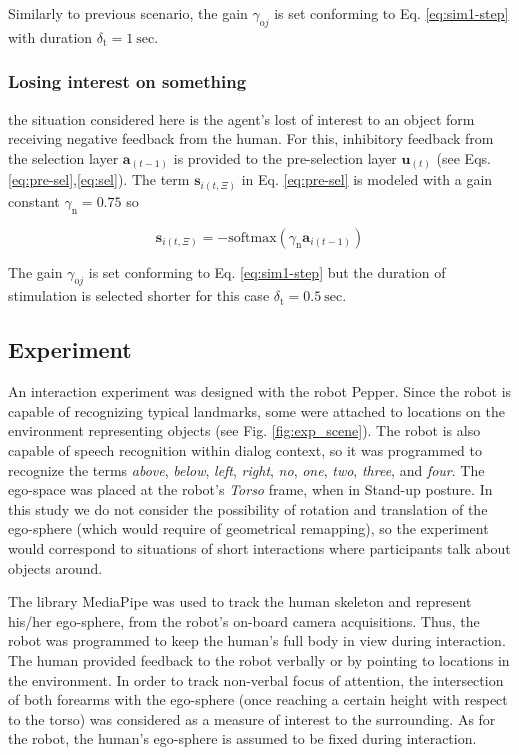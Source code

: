 \documentclass[letterpaper, 10 pt, conference]{ieeeconf}  %
\begin{document}
	\noindent Similarly to previous scenario, the gain $\gamma_{\mathrm{o}j}$ is set conforming to Eq. \eqref{eq:sim1-step} with duration $\delta_\mathrm{t} = 1\ \mathrm{sec}$. 
	
	\subsubsection{Losing interest on something} the situation considered here is the agent's lost of interest to an object form receiving negative feedback from the human. For this, inhibitory feedback from the selection layer $\mathbf{a}_{(t-1)}$ is provided to the pre-selection layer $\mathbf{u}_{(t)}$ (see Eqs. \eqref{eq:pre-sel},\eqref{eq:sel}). The term $\mathbf{s}_{i(t,\Xi)}$ in Eq. \eqref{eq:pre-sel} is modeled with a gain constant $\gamma_\mathrm{n}= 0.75$ so
	
	\begin{equation}
	\mathbf{s}_{i(t,\Xi)} = -\mathrm{softmax}\left(\gamma_\mathrm{n}\mathbf{a}_{i(t-1)}\right)
	\label{eq:sim3}
	\end{equation}
	
	\noindent The gain $\gamma_{\mathrm{o}j}$ is set conforming to Eq. \eqref{eq:sim1-step} but the duration of stimulation is selected shorter for this case $\delta_\mathrm{t} = 0.5\ \mathrm{sec}$. 
		
	
	\subsection{Experiment}
	
	An interaction experiment was designed with the robot Pepper. Since the robot is capable of recognizing typical landmarks, some were attached to locations on the environment representing objects (see Fig. \ref{fig:exp_scene}). The robot is also capable of speech recognition within dialog context, so it was programmed to recognize the terms \textit{above}, \textit{below}, \textit{left}, \textit{right}, \textit{no}, \textit{one}, \textit{two}, \textit{three}, and \textit{four}. The ego-space was placed at the robot's \textit{Torso} frame, when in Stand-up posture. In this study we do not consider the possibility of rotation and translation of the ego-sphere (which would require of geometrical remapping), so the experiment would correspond to situations of short interactions where participants talk about objects around. 
	
	The library MediaPipe was used to track the human skeleton and represent his/her ego-sphere, from the robot's on-board camera acquisitions. Thus, the robot was programmed to keep the human's full body in view during interaction. The human provided feedback to the robot verbally or by pointing to locations in the environment. In order to track non-verbal focus of attention, the intersection of both forearms with the ego-sphere (once reaching a certain height with respect to the torso) was considered as a measure of interest to the surrounding. As for the robot, the human's ego-sphere is assumed to be fixed during interaction. 
	
\end{document}
